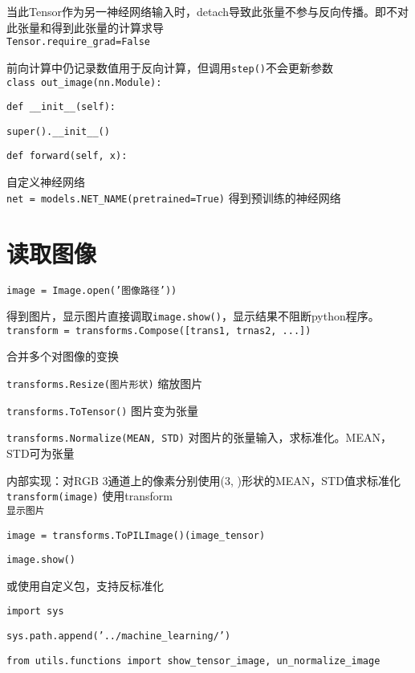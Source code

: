 \documentclass[UTF8]{ctexart}
\begin{document}
  当此Tensor作为另一神经网络输入时，detach导致此张量不参与反向传播。即不对此张量和得到此张量的计算求导\\
\texttt{Tensor.require\_grad=False}

  前向计算中仍记录数值用于反向计算，但调用\texttt{step()}不会更新参数\\
\texttt{class out\_image(nn.Module):}

  \texttt{def \_\_init\_\_(self):}

  \quad \texttt{super().\_\_init\_\_()}

  \texttt{def forward(self, x):}

  \quad 自定义神经网络\\
\texttt{net = models.NET\_NAME(pretrained=True)} 得到预训练的神经网络

\section{读取图像}
\noindent \texttt{image = Image.open('图像路径'))}

  得到图片，显示图片直接调取\texttt{image.show()}，显示结果不阻断python程序。\\
\texttt{transform = transforms.Compose([trans1, trnas2, ...])}

  合并多个对图像的变换

  \texttt{transforms.Resize(图片形状)} 缩放图片

  \texttt{transforms.ToTensor()} 图片变为张量

  \texttt{transforms.Normalize(MEAN, STD)} 对图片的张量输入，求标准化。MEAN，STD可为张量
  
  \quad 内部实现：对RGB 3通道上的像素分别使用(3, )形状的MEAN，STD值求标准化\\
\texttt{transform(image)} 使用transform\\
\texttt{显示图片}

  \texttt{image = transforms.ToPILImage()(image\_tensor)}

  \texttt{image.show()}
  
  \quad 或使用自定义包，支持反标准化

  \texttt{import sys}

  \texttt{sys.path.append('../machine\_learning/')}

  \texttt{from utils.functions import show\_tensor\_image, un\_normalize\_image}
\end{document}
